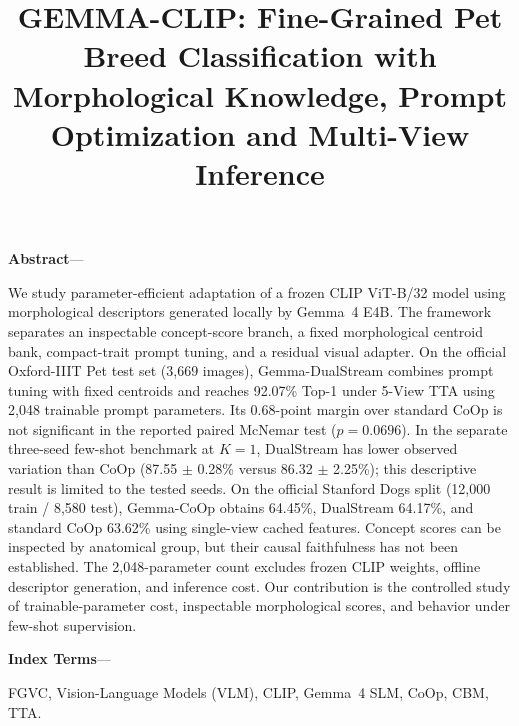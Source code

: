 \documentclass[conference]{IEEEtran}
\makeatletter
\renewcommand\section{\@startsection{section}{1}{\z@}{1.1ex plus 0.2ex minus 0.1ex}{0.5ex plus 0.1ex}{\large\bfseries}}
\renewenvironment{abstract}{%
  \normalfont\small
  \textbf{Abstract}---%
  \mdseries
}{%
  \par\vspace{4pt}
}
\renewenvironment{IEEEkeywords}{%
  \normalfont\small
  \textbf{Index Terms}---%
  \mdseries
}{%
  \par\vspace{6pt}
}
\makeatother
\begin{document}
\title{\Large\bfseries GEMMA-CLIP: Fine-Grained Pet Breed Classification with Morphological Knowledge, Prompt Optimization and Multi-View Inference}

\author{
}

\maketitle
\thispagestyle{plain}

\begin{abstract}
We study parameter-efficient adaptation of a frozen CLIP ViT-B/32 model using morphological descriptors generated locally by Gemma~4 E4B. The framework separates an inspectable concept-score branch, a fixed morphological centroid bank, compact-trait prompt tuning, and a residual visual adapter. On the official Oxford-IIIT Pet test set (3,669 images), Gemma-DualStream combines prompt tuning with fixed centroids and reaches 92.07\% Top-1 under 5-View TTA using 2,048 trainable prompt parameters. Its 0.68-point margin over standard CoOp is not significant in the reported paired McNemar test ($p=0.0696$). In the separate three-seed few-shot benchmark at $K=1$, DualStream has lower observed variation than CoOp (87.55 $\pm$ 0.28\% versus 86.32 $\pm$ 2.25\%); this descriptive result is limited to the tested seeds. On the official Stanford Dogs split (12,000 train / 8,580 test), Gemma-CoOp obtains 64.45\%, DualStream 64.17\%, and standard CoOp 63.62\% using single-view cached features. Concept scores can be inspected by anatomical group, but their causal faithfulness has not been established. The 2,048-parameter count excludes frozen CLIP weights, offline descriptor generation, and inference cost. Our contribution is the controlled study of trainable-parameter cost, inspectable morphological scores, and behavior under few-shot supervision.
\end{abstract}

\begin{IEEEkeywords}
FGVC, Vision-Language Models (VLM), CLIP, Gemma~4 SLM, CoOp, CBM, TTA.
\end{IEEEkeywords}

\section{Introduction}
\end{document}
